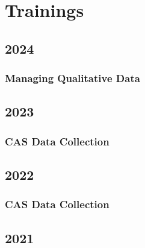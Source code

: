 \documentclass[
  letterpaper,
  DIV=11,
  numbers=noendperiod]{scrreprt}
\begin{document}
\chapter*{Trainings}\label{trainings}


\section*{2024}\label{section}


\subsection*{Managing Qualitative Data}\label{managing-qualitative-data}

\section*{2023}\label{section-1}


\subsection*{CAS Data Collection}\label{cas-data-collection}

\section*{2022}\label{section-2}


\subsection*{CAS Data Collection}\label{cas-data-collection-1}

\section*{2021}\label{section-3}

\end{document}
